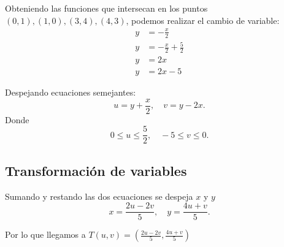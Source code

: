 \begin{center}
    \end{center}

    Obteniendo las funciones que intersecan en los puntos $(0,1),(1,0),(3,4),(4,3)$, podemos realizar el cambio de variable:
    \begin{align}
        y &= -\frac{x}{2} \\
        y &= -\frac{x}{2} + \frac{5}{2} \\
        y &= 2x \\
        y &= 2x - 5
    \end{align}

    Despejando ecuaciones semejantes:
    \[
        u = y + \frac{x}{2}, \quad v = y - 2x.
    \]    
    Donde 
    \[
        0\leq u \leq \frac{5}{2}, \quad -5 \leq v \leq 0.
    \]

    \subsection*{Transformación de variables}
    Sumando y restando las dos ecuaciones se despeja $x$ y $y$
    \[
        x = \frac{2u - 2v}{5}, \quad y = \frac{4u + v}{5}.
    \]

    \vspace{10pt}
    Por lo que llegamos a $T(u,v) = (\frac{2u - 2v}{5},\frac{4u + v}{5})$

